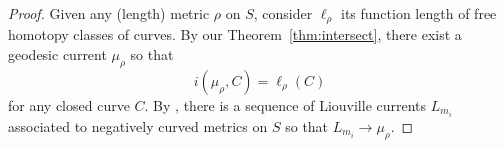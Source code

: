 

\begin{proof}
Given any (length) metric $\rho$ on $S$, consider $\ell_{\rho}$ its function length of free homotopy classes of curves.
By our Theorem~\ref{thm:intersect}, there exist a geodesic current $\mu_{\rho}$ so that
\[
i(\mu_{\rho},C)=\ell_{\rho}(C)
\]
for any closed curve $C$.
By \cite[Lemma~2.18]{Ham99:Cocycles}, there is a sequence of Liouville currents $L_{m_i}$ associated to negatively curved metrics on $S$ so that $L_{m_i} \to \mu_{\rho}$.

\end{proof}